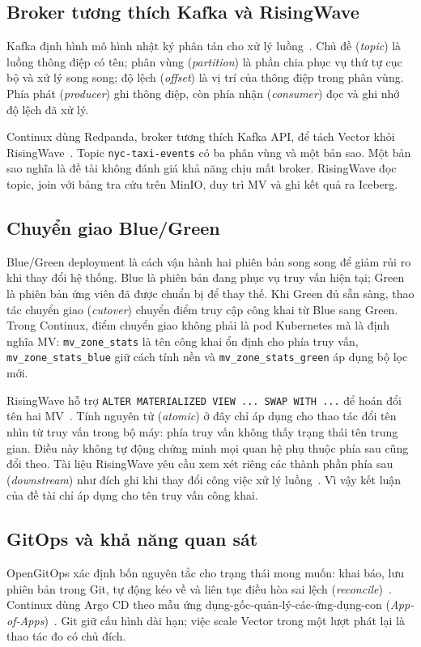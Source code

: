\subsection{Broker tương thích Kafka và RisingWave}
Kafka định hình mô hình nhật ký phân tán cho xử lý luồng~\parencite{kreps2011kafka}. Chủ đề (\emph{topic}) là luồng thông điệp có tên; phân vùng (\emph{partition}) là phần chia phục vụ thứ tự cục bộ và xử lý song song; độ lệch (\emph{offset}) là vị trí của thông điệp trong phân vùng. Phía phát (\emph{producer}) ghi thông điệp, còn phía nhận (\emph{consumer}) đọc và ghi nhớ độ lệch đã xử lý.

Continux dùng Redpanda, broker tương thích Kafka API, để tách Vector khỏi RisingWave~\parencite{redpandadocs}. Topic \texttt{nyc-taxi-events} có ba phân vùng và một bản sao. Một bản sao nghĩa là đề tài không đánh giá khả năng chịu mất broker. RisingWave đọc topic, join với bảng tra cứu trên MinIO, duy trì MV và ghi kết quả ra Iceberg.

\subsection{Chuyển giao Blue/Green}
Blue/Green deployment là cách vận hành hai phiên bản song song để giảm rủi ro khi thay đổi hệ thống. Blue là phiên bản đang phục vụ truy vấn hiện tại; Green là phiên bản ứng viên đã được chuẩn bị để thay thế. Khi Green đủ sẵn sàng, thao tác chuyển giao (\emph{cutover}) chuyển điểm truy cập công khai từ Blue sang Green. Trong Continux, điểm chuyển giao không phải là pod Kubernetes mà là định nghĩa MV: \texttt{mv\_zone\_stats} là tên công khai ổn định cho phía truy vấn, \texttt{mv\_zone\_stats\_blue} giữ cách tính nền và \texttt{mv\_zone\_stats\_green} áp dụng bộ lọc mới.

RisingWave hỗ trợ \texttt{ALTER MATERIALIZED VIEW ... SWAP WITH ...} để hoán đổi tên hai MV~\parencite{risingwaveSwap}. Tính nguyên tử (\emph{atomic}) ở đây chỉ áp dụng cho thao tác đổi tên nhìn từ truy vấn trong bộ máy: phía truy vấn không thấy trạng thái tên trung gian. Điều này không tự động chứng minh mọi quan hệ phụ thuộc phía sau cũng đổi theo. Tài liệu RisingWave yêu cầu xem xét riêng các thành phần phía sau (\emph{downstream}) như đích ghi khi thay đổi công việc xử lý luồng~\parencite{risingwaveAlterJobs}. Vì vậy kết luận của đề tài chỉ áp dụng cho tên truy vấn công khai.

\subsection{GitOps và khả năng quan sát}
OpenGitOps xác định bốn nguyên tắc cho trạng thái mong muốn: khai báo, lưu phiên bản trong Git, tự động kéo về và liên tục điều hòa sai lệch (\emph{reconcile})~\parencite{opengitops}. Continux dùng Argo CD theo mẫu ứng dụng-gốc-quản-lý-các-ứng-dụng-con (\emph{App-of-Apps})~\parencite{argocddocs}. Git giữ cấu hình dài hạn; việc scale Vector trong một lượt phát lại là thao tác đo có chủ đích.


